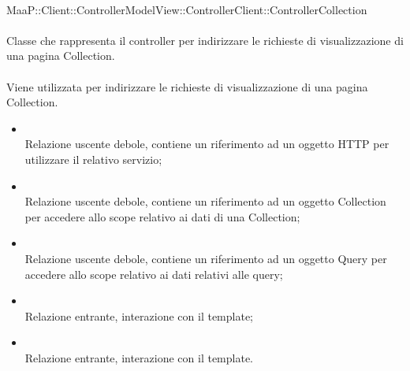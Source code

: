 	\\
	MaaP::Client::ControllerModelView::ControllerClient::ControllerCollection\\
	\\
	Classe che rappresenta il controller per indirizzare le richieste di visualizzazione di una pagina Collection.\\
	\\
	Viene utilizzata per indirizzare le richieste di visualizzazione di una pagina Collection.\\
	\begin{itemize}
	\item{}\\
	Relazione uscente debole, contiene un riferimento ad un oggetto HTTP per utilizzare il relativo servizio;
	\item{}\\
	Relazione uscente debole, contiene un riferimento ad un oggetto Collection per accedere allo scope relativo ai dati di una Collection;
	\item{}\\
	Relazione uscente debole, contiene un riferimento ad un oggetto Query per accedere allo scope relativo ai dati relativi alle query;
	\item{}\\
	Relazione entrante, interazione con il template;
	\item{}\\
	Relazione entrante, interazione con il template.
	\end{itemize}
	
